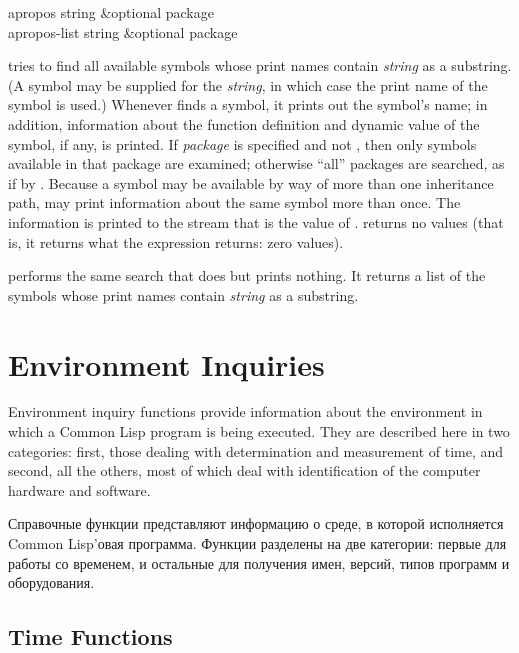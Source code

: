 \begin{defun}[Function]
apropos string &optional package \\
apropos-list string &optional package

 tries to find all available symbols whose print names
contain \emph{string} as a substring.  (A symbol may be supplied for
the \emph{string}, in which case the print name of the symbol is used.)
Whenever  finds a symbol, it prints
out the symbol's name; in addition,
information about the function definition and dynamic value of the symbol,
if any, is printed.
If \emph{package} is specified and not {\nil}, then only symbols
available in that package are examined;
otherwise ``all'' packages are searched, as if by .
Because a symbol may be available by way of more than one inheritance
path,  may print information about the same symbol more than once.
The information is printed to the stream that is the value
of .
 returns no values (that is, it returns what the expression
 returns: zero values).

 performs the same search that  does but
prints nothing.  It returns a list of the symbols whose print names
contain \emph{string} as a substring.
\end{defun}

\section{Environment Inquiries}


Environment inquiry functions provide information about the
environment in which a Common Lisp program is being executed.
They are described here in two categories: first, those dealing with
determination and measurement of time, and second, all the others,
most of which deal with identification of the computer hardware
and software.

Справочные функции представляют информацию о среде, в которой исполняется Common
Lisp'овая программа.
Функции разделены на две категории: первые для работы со временем, и остальные
для получения имен, версий, типов программ и оборудования.

\subsection{Time Functions}
\label{TIME-SECTION}

